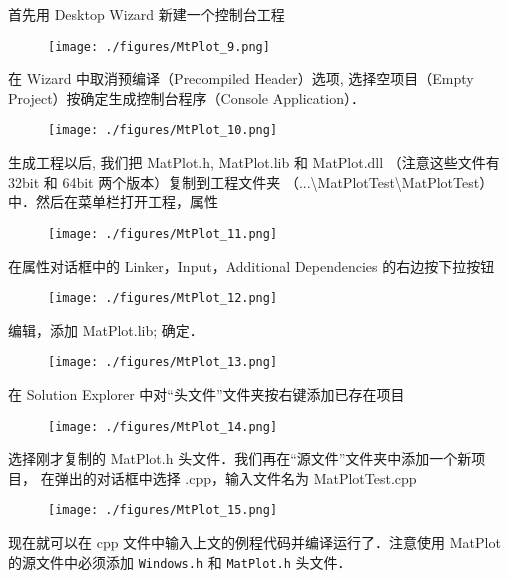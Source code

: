 首先用 Desktop Wizard 新建一个控制台工程
\begin{figure}[ht]
\centering
\texttt{[image: ./figures/MtPlot\_9.png]}
\caption{} \label{MtPlot_fig9}
\end{figure}

在 Wizard 中取消预编译（Precompiled Header）选项, 选择空项目（Empty Project）按确定生成控制台程序（Console Application）．

\begin{figure}[ht]
\centering
\texttt{[image: ./figures/MtPlot\_10.png]}
\caption{} \label{MtPlot_fig10}
\end{figure}

生成工程以后, 我们把 MatPlot.h, MatPlot.lib 和 MatPlot.dll （注意这些文件有 32bit 和 64bit 两个版本）复制到工程文件夹 （...\textbackslash MatPlotTest\textbackslash MatPlotTest）中．然后在菜单栏打开工程，属性

\begin{figure}[ht]
\centering
\texttt{[image: ./figures/MtPlot\_11.png]}
\caption{} \label{MtPlot_fig11}
\end{figure}

在属性对话框中的 Linker，Input，Additional Dependencies 的右边按下拉按钮

\begin{figure}[ht]
\centering
\texttt{[image: ./figures/MtPlot\_12.png]}
\caption{} \label{MtPlot_fig12}
\end{figure}

编辑，添加 MatPlot.lib; 确定．

\begin{figure}[ht]
\centering
\texttt{[image: ./figures/MtPlot\_13.png]}
\caption{} \label{MtPlot_fig13}
\end{figure}

在 Solution Explorer 中对“头文件”文件夹按右键添加已存在项目

\begin{figure}[ht]
\centering
\texttt{[image: ./figures/MtPlot\_14.png]}
\caption{} \label{MtPlot_fig14}
\end{figure}

选择刚才复制的 MatPlot.h 头文件．我们再在“源文件”文件夹中添加一个新项目， 在弹出的对话框中选择 .cpp，输入文件名为 MatPlotTest.cpp

\begin{figure}[ht]
\centering
\texttt{[image: ./figures/MtPlot\_15.png]}
\caption{} \label{MtPlot_fig15}
\end{figure}

现在就可以在 cpp 文件中输入上文的例程代码并编译运行了．注意使用 MatPlot 的源文件中必须添加 \verb|Windows.h| 和 \verb|MatPlot.h| 头文件．
